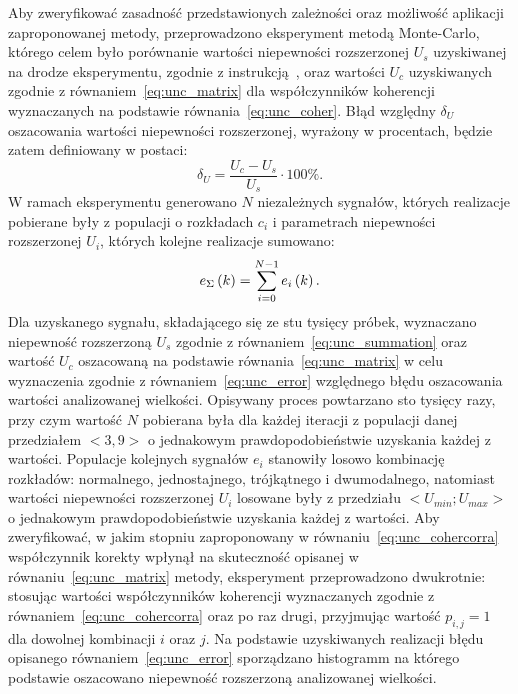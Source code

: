 Aby zweryfikować zasadność przedstawionych zależności oraz możliwość aplikacji zaproponowanej metody, przeprowadzono eksperyment metodą Monte-Carlo, którego celem było porównanie wartości niepewności rozszerzonej $U_{s}$ uzyskiwanej na drodze eksperymentu, zgodnie z instrukcją~\cite{jcgm_montecarlo}, oraz wartości $U_{c}$ uzyskiwanych zgodnie z równaniem~\eqref{eq:unc_matrix} dla współczynników koherencji wyznaczanych na podstawie równania~\eqref{eq:unc_coher}. Błąd względny $\delta_{U}$ oszacowania wartości niepewności rozszerzonej, wyrażony w procentach, będzie zatem definiowany w postaci:
\begin{equation}
\delta_{U} =  \frac{U_{c} - U_{s}}{U_{s}} \cdot 100\% \label{eq:unc_error}.
\end{equation}
W ramach eksperymentu generowano $N$ niezależnych sygnałów, których realizacje pobierane były z populacji o rozkładach $c_{i}$ i parametrach niepewności rozszerzonej $U_{i}$, których kolejne realizacje sumowano:
\begin{equation}
e_{\Sigma} \left(k\right) = \sum _{i=0} ^{N-1} e_{i} \left(k\right) \label{eq:unc_testsignal}.
\end{equation}
Dla uzyskanego sygnału, składającego się ze stu tysięcy próbek, wyznaczano niepewność rozszerzoną $U_{s}$ zgodnie z równaniem~\eqref{eq:unc_summation} oraz wartość $U_{c}$ oszacowaną na podstawie równania~\eqref{eq:unc_matrix} w celu wyznaczenia zgodnie z równaniem~\eqref{eq:unc_error} względnego błędu oszacowania wartości analizowanej wielkości. Opisywany proces powtarzano sto tysięcy razy, przy czym wartość $N$ pobierana była dla każdej iteracji z populacji danej przedziałem $<3,9>$ o jednakowym prawdopodobieństwie uzyskania każdej z wartości. Populacje kolejnych sygnałów $e_{i}$ stanowiły losowo kombinację rozkładów: normalnego, jednostajnego, trójkątnego i dwumodalnego, natomiast wartości niepewności rozszerzonej $U_{i}$ losowane były z przedziału $<U_{min};U_{max}>$ o jednakowym prawdopodobieństwie uzyskania każdej z wartości. Aby zweryfikować, w jakim stopniu zaproponowany w równaniu~\eqref{eq:unc_cohercorra} współczynnik korekty wpłynął na skuteczność opisanej w równaniu~\eqref{eq:unc_matrix} metody, eksperyment przeprowadzono dwukrotnie: stosując wartości współczynników koherencji wyznaczanych zgodnie z równaniem~\eqref{eq:unc_cohercorra} oraz po raz drugi, przyjmując wartość $p_{i,j} = 1$ dla dowolnej kombinacji $i$ oraz $j$. Na podstawie uzyskiwanych realizacji błędu opisanego równaniem~\eqref{eq:unc_error} sporządzano histogramm na którego podstawie oszacowano niepewność rozszerzoną analizowanej wielkości.

